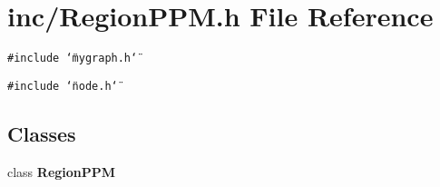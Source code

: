 \section{inc/RegionPPM.h File Reference}
\label{RegionPPM_8h}
{\tt \#include \char`\"{}mygraph.h\char`\"{}}\par
{\tt \#include \char`\"{}node.h\char`\"{}}\par
\subsection*{Classes}
\begin{CompactItemize}
\item 
class {\bf RegionPPM}
\end{CompactItemize}
